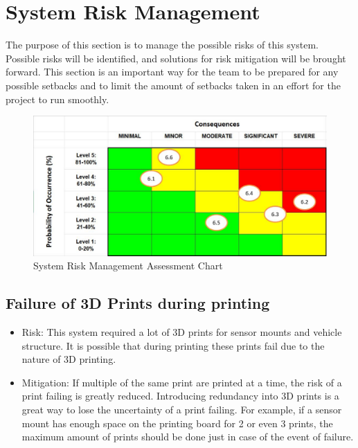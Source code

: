 \documentclass[11pt]{report}
\begin{document}
\chapter{System Risk Management}\label{ch:system-risk-management}
The purpose of this section is to manage the possible risks of this system. Possible risks will be identified, and solutions for risk mitigation will be brought forward. This section is an important way for the team to be prepared for any possible setbacks and to limit the amount of setbacks taken in an effort for the project to run smoothly.

\begin{figure}[H]
    \centering
    \includegraphics[width=0.8\linewidth]{Graphs/SystemRiskManagementGraph.pdf}
    \caption{System Risk Management Assessment Chart}
    \label{fig:system-management}
\end{figure}

\section{Failure of 3D Prints during printing}
\begin{itemize}
    \item Risk: This system required a lot of 3D prints for sensor mounts and vehicle structure. It is possible that during printing these prints fail due to the nature of 3D printing. 
    \item Mitigation: If multiple of the same print are printed at a time, the risk of a print failing is greatly reduced. Introducing redundancy into 3D prints is a great way to lose the uncertainty of a print failing. For example, if a sensor mount has enough space on the printing board for 2 or even 3 prints, the maximum amount of prints should be done just in case of the event of failure. 
\end{itemize}
\end{document}
